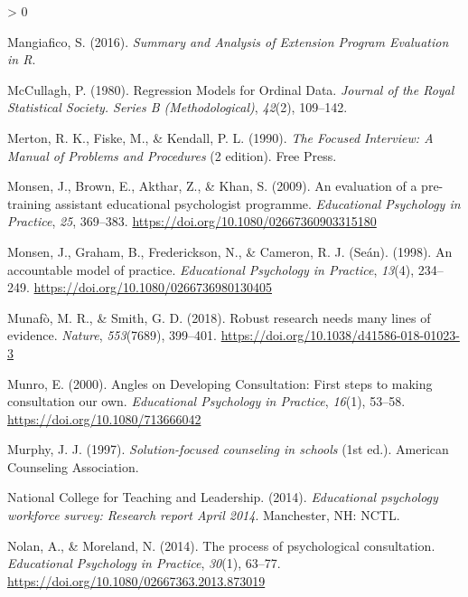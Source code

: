 \documentclass[
  english,
  man]{apa7}
\newlength{\cslhangindent}
\newenvironment{CSLReferences}[2] %
 {%
  \setlength{\parindent}{0pt}
  \ifodd #1 \everypar{\setlength{\hangindent}{\cslhangindent}}\ignorespaces\fi
  \ifnum #2 > 0
  \setlength{\parskip}{#2\baselineskip}
  \fi
 }%
 {}
\begin{document}
\begin{CSLReferences}{1}{0}
\leavevmode\hypertarget{ref-mangiaficoSummaryAnalysisExtension2016}{}%
Mangiafico, S. (2016). \emph{Summary and {Analysis} of {Extension Program Evaluation} in {R}}.

\leavevmode\hypertarget{ref-mccullaghRegressionModelsOrdinal1980}{}%
McCullagh, P. (1980). Regression {Models} for {Ordinal Data}. \emph{Journal of the Royal Statistical Society. Series B (Methodological)}, \emph{42}(2), 109--142.

\leavevmode\hypertarget{ref-mertonFocusedInterviewManual1990}{}%
Merton, R. K., Fiske, M., \& Kendall, P. L. (1990). \emph{The {Focused Interview}: {A Manual} of {Problems} and {Procedures}} (2 edition). {Free Press}.

\leavevmode\hypertarget{ref-monsenEvaluationPreTraining2009}{}%
Monsen, J., Brown, E., Akthar, Z., \& Khan, S. (2009). An evaluation of a pre-training assistant educational psychologist programme. \emph{Educational Psychology in Practice}, \emph{25}, 369--383. \url{https://doi.org/10.1080/02667360903315180}

\leavevmode\hypertarget{ref-monsenAccountableModelPractice1998}{}%
Monsen, J., Graham, B., Frederickson, N., \& Cameron, R. J. (Seán). (1998). An accountable model of practice. \emph{Educational Psychology in Practice}, \emph{13}(4), 234--249. \url{https://doi.org/10.1080/0266736980130405}

\leavevmode\hypertarget{ref-munafoRobustResearchNeeds2018}{}%
Munafò, M. R., \& Smith, G. D. (2018). Robust research needs many lines of evidence. \emph{Nature}, \emph{553}(7689), 399--401. \url{https://doi.org/10.1038/d41586-018-01023-3}

\leavevmode\hypertarget{ref-munroAnglesDevelopingConsultation2000}{}%
Munro, E. (2000). Angles on {Developing Consultation}: {First} steps to making consultation our own. \emph{Educational Psychology in Practice}, \emph{16}(1), 53--58. \url{https://doi.org/10.1080/713666042}

\leavevmode\hypertarget{ref-murphySolutionfocusedCounselingSchools1997}{}%
Murphy, J. J. (1997). \emph{Solution-focused counseling in schools} (1st ed.). {American Counseling Association}.

\leavevmode\hypertarget{ref-nationalcollegeforteachingandleadershipEducationalPsychologyWorkforce2014}{}%
National College for Teaching and Leadership. (2014). \emph{Educational psychology workforce survey: {Research} report {April} 2014}. {Manchester, NH: NCTL}.

\leavevmode\hypertarget{ref-nolanProcessPsychologicalConsultation2014}{}%
Nolan, A., \& Moreland, N. (2014). The process of psychological consultation. \emph{Educational Psychology in Practice}, \emph{30}(1), 63--77. \url{https://doi.org/10.1080/02667363.2013.873019}


\end{CSLReferences}
\end{document}
